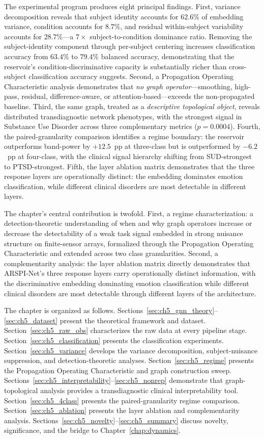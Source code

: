 The experimental program produces eight principal findings. First, variance decomposition reveals that subject identity accounts for $62.6\%$ of embedding variance, condition accounts for $8.7\%$, and residual within-subject variability accounts for $28.7\%$---a $7\times$ subject-to-condition dominance ratio. Removing the subject-identity component through per-subject centering increases classification accuracy from $63.4\%$ to $79.4\%$ balanced accuracy, demonstrating that the reservoir's condition-discriminative capacity is substantially richer than cross-subject classification accuracy suggests. Second, a Propagation Operating Characteristic analysis demonstrates that \emph{no graph operator}---smoothing, high-pass, residual, difference-aware, or attention-based---exceeds the non-propagated baseline. Third, the same graph, treated as a \emph{descriptive topological object}, reveals distributed transdiagnostic network phenotypes, with the strongest signal in Substance Use Disorder across three complementary metrics ($p = 0.0004$). Fourth, the paired-granularity comparison identifies a regime boundary: the reservoir outperforms band-power by $+12.5$~pp at three-class but is outperformed by $-6.2$~pp at four-class, with the clinical signal hierarchy shifting from SUD-strongest to PTSD-strongest. Fifth, the layer ablation matrix demonstrates that the three response layers are operationally distinct: the embedding dominates emotion classification, while different clinical disorders are most detectable in different layers.

The chapter's central contribution is twofold. First, a regime characterization: a detection-theoretic understanding of when and why graph operators increase or decrease the detectability of a weak task signal embedded in strong nuisance structure on finite-sensor arrays, formalized through the Propagation Operating Characteristic and extended across two class granularities. Second, a complementarity analysis: the layer ablation matrix directly demonstrates that ARSPI-Net's three response layers carry operationally distinct information, with the discriminative embedding dominating emotion classification while different clinical disorders are most detectable through different layers of the architecture.

The chapter is organized as follows. Sections~\ref{sec:ch5_gnn_theory}--\ref{sec:ch5_dataset} present the theoretical framework and dataset. Section~\ref{sec:ch5_raw_obs} characterizes the raw data at every pipeline stage. Section~\ref{sec:ch5_classification} presents the classification experiments. Section~\ref{sec:ch5_variance} develops the variance decomposition, subject-nuisance suppression, and detection-theoretic analyses. Section~\ref{sec:ch5_regime} presents the Propagation Operating Characteristic and graph construction sweep. Sections~\ref{sec:ch5_interpretability}--\ref{sec:ch5_nonrep} demonstrate that graph-topological analysis provides a transdiagnostic clinical interpretability tool. Section~\ref{sec:ch5_4class} presents the paired-granularity regime comparison. Section~\ref{sec:ch5_ablation} presents the layer ablation and complementarity analysis. Sections~\ref{sec:ch5_novelty}--\ref{sec:ch5_summary} discuss novelty, significance, and the bridge to Chapter~\ref{chap:dynamics}.


